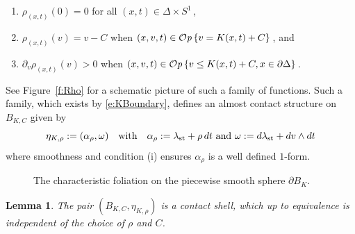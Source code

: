 \documentclass[12pt]{paper}
\theoremstyle{plain}
\newtheorem{lemma}[theorem]{Lemma}
\theoremstyle{definition}
\newcommand{\p}{\partial}
\newcommand{\R}{{\mathbb{R}}}
\newcommand{\st}{{\rm st}}
\def\Op{{\mathcal O}{\it p}\,}
\numberwithin{figure}{section}
\begin{document}
\begin{enumerate}
\item $\rho_{(x,t)}(0) = 0$ for all $(x,t) \in \Delta \times S^1$\,,
\item $\rho_{(x,t)}(v) = v - C$ when $(x,v,t) \in \Op\{v = K(x,t) +C\}$\,, and
\item $\p_v \rho_{(x,t)}(v) > 0$ when $(x,v,t) \in \Op\{v \leq K(x,t) + C, x \in \p\Delta\}$\,.
\end{enumerate}
See Figure~\ref{f:Rho} for a schematic picture of such a family of functions.
Such a family, which exists by \eqref{e:KBoundary}, defines an almost contact structure on $B_{K, C}$ given by
\begin{equation}\label{S1ContactForm}
	\eta_{K, \rho} := (\alpha_\rho, \omega) \quad\mbox{with}\quad \alpha_\rho := \lambda_{\st} + \rho\,dt
	\mbox{ and } \omega := d\lambda_{\st} + dv\wedge dt
\end{equation}
where smoothness and condition (i) ensures $\alpha_\rho$ is a well defined $1$-form.
\begin{figure}
   \centering
   \def\svgwidth{150pt}
   
   \caption{The characteristic foliation on the piecewise smooth sphere $\partial B_K$.}
  \label{f:poly}
\end{figure} 
\begin{lemma}\label{l:CircleShell}
	The pair $(B_{K,C}, \eta_{K,\rho})$ is a contact shell, which up to 
	equivalence is independent of the choice of $\rho$ and $C$.
\end{lemma}
\end{document}
